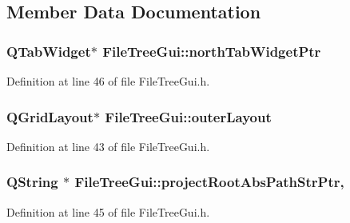 \subsection{Member Data Documentation}
\hypertarget{class_file_tree_gui_ae44c6d73787d55eae9bed8e16ff9f34a}{
\subsubsection[{north\-Tab\-Widget\-Ptr}]{\setlength{\rightskip}{0pt plus 5cm}Q\-Tab\-Widget$\ast$ File\-Tree\-Gui\-::north\-Tab\-Widget\-Ptr\hspace{0.3cm}{\ttfamily [private]}}}\label{class_file_tree_gui_ae44c6d73787d55eae9bed8e16ff9f34a}


Definition at line 46 of file File\-Tree\-Gui.\-h.

\hypertarget{class_file_tree_gui_aaf8b63a4775b1d46d635cdaef94b979a}{
\subsubsection[{outer\-Layout}]{\setlength{\rightskip}{0pt plus 5cm}Q\-Grid\-Layout$\ast$ File\-Tree\-Gui\-::outer\-Layout\hspace{0.3cm}{\ttfamily [private]}}}\label{class_file_tree_gui_aaf8b63a4775b1d46d635cdaef94b979a}


Definition at line 43 of file File\-Tree\-Gui.\-h.

\hypertarget{class_file_tree_gui_a9ce991f8f95f583aa5fb1bec7a9bcd4c}{
\subsubsection[{project\-Root\-Abs\-Path\-Str\-Ptr}]{\setlength{\rightskip}{0pt plus 5cm}Q\-String $\ast$ File\-Tree\-Gui\-::project\-Root\-Abs\-Path\-Str\-Ptr\hspace{0.3cm}{\ttfamily [static]}, {\ttfamily [private]}}}\label{class_file_tree_gui_a9ce991f8f95f583aa5fb1bec7a9bcd4c}


Definition at line 45 of file File\-Tree\-Gui.\-h.

